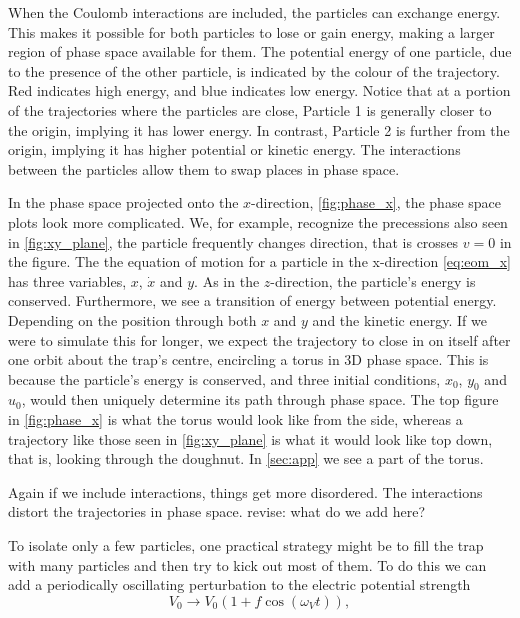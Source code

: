 When the Coulomb interactions are included, the particles can exchange energy. This makes it possible for both particles to lose or gain energy, making
a larger region of phase space available for them.
The potential energy of one particle, due to the presence of the other particle, is indicated by the colour of the trajectory. Red indicates high energy, and blue indicates low energy. Notice that at
a portion of the trajectories where the particles are close, Particle 1 is generally closer to the
origin, implying it has lower energy. In contrast, Particle 2 is further from the origin, implying it has higher potential or kinetic energy. The interactions between the particles allow them to swap places
in phase space.

In the phase space projected onto the $x$-direction, \autoref{fig:phase_x}, the phase space plots look more complicated.
We, for example, recognize the precessions also seen in \autoref{fig:xy_plane}, the particle frequently changes direction, that is
crosses $v=0$ in the figure.
The the equation of motion for a particle in the x-direction \autoref{eq:eom_x} has three variables, $x$, $\dot{x}$ and $y$.
As in the $z$-direction, the particle's energy is conserved. Furthermore, we see a transition of energy between potential energy. 
Depending on the position through both $x$ and $y$ and the kinetic energy. If we were to simulate this for longer, we expect
the trajectory to close in on itself after one orbit about the trap's centre, encircling a torus in 3D phase space. This is because the particle's energy is conserved, and three initial conditions, $x_0$, $y_0$ and $u_0$, would then uniquely determine its path through phase space. \cite{leinaas:klasmek}
The top figure in \autoref{fig:phase_x} is what the torus would look like from the side, whereas a trajectory like those seen in \autoref{fig:xy_plane} is what it would look like top down, that is, looking through the doughnut.
In \autoref{sec:app} we see a part of the torus.

Again if we include interactions, things get more disordered. The interactions distort the trajectories in phase space.
revise: what do we add here?

To isolate only a few particles, one practical strategy might be to fill the
trap with many particles and then try to kick out most of them. To do this
we can add a periodically oscillating perturbation to the electric potential strength
\begin{equation}
  V_0 \rightarrow V_0(1 + f\cos (\omega_V t)),
  \end{equation}

